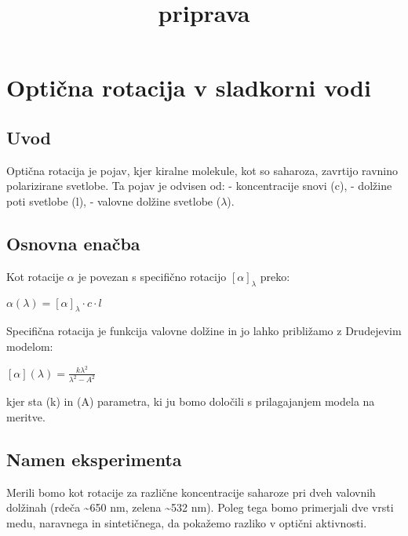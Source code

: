\documentclass[11pt]{article}
\title{priprava}
\begin{document}
    
    \maketitle
    
    

    
    \hypertarget{optiux10dna-rotacija-v-sladkorni-vodi}{%
\section{Optična rotacija v sladkorni
vodi}\label{optiux10dna-rotacija-v-sladkorni-vodi}}

\hypertarget{uvod}{%
\subsection{Uvod}\label{uvod}}

Optična rotacija je pojav, kjer kiralne molekule, kot so saharoza,
zavrtijo ravnino polarizirane svetlobe. Ta pojav je odvisen od: -
koncentracije snovi (c), - dolžine poti svetlobe (l), - valovne dolžine
svetlobe (\(\lambda\)).

\hypertarget{osnovna-enaux10dba}{%
\subsection{Osnovna enačba}\label{osnovna-enaux10dba}}

Kot rotacije \(\alpha\) je povezan s specifično rotacijo
\([\alpha]_\lambda\) preko:

\(\alpha(\lambda) = [\alpha]_\lambda \cdot c \cdot l\)

Specifična rotacija je funkcija valovne dolžine in jo lahko približamo z
Drudejevim modelom:

\([\alpha](\lambda) = \frac{k \lambda^2}{\lambda^2 - A^2}\)

kjer sta (k) in (A) parametra, ki ju bomo določili s prilagajanjem
modela na meritve.

\hypertarget{namen-eksperimenta}{%
\subsection{Namen eksperimenta}\label{namen-eksperimenta}}

Merili bomo kot rotacije za različne koncentracije saharoze pri dveh
valovnih dolžinah (rdeča \textasciitilde650 nm, zelena
\textasciitilde532 nm). Poleg tega bomo primerjali dve vrsti medu,
naravnega in sintetičnega, da pokažemo razliko v optični aktivnosti.
\end{document}
